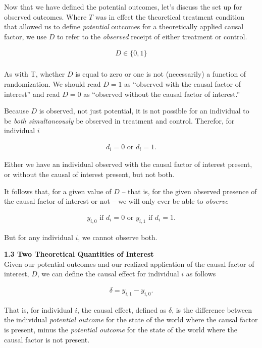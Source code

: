 \documentclass[11pt]{article}
\begin{document}
\normalsize
Now that we have defined the potential outcomes, let's discuss the set up for observed outcomes.  Where $T$ was in effect the theoretical treatment condition that allowed us to define \emph{potential} outcomes for a theoretically applied causal factor, we use $D$ to refer to the \emph{observed} receipt of either treatment or control.

\begin{align*}
  D \in \{0,1\}\\
\end{align*}

As with T, whether $D$ is equal to zero or one is not (necessarily) a function of randomization.  We should read $D=1$ as ``observed with the causal factor of interest'' and read $D=0$ as ``observed without the causal factor of interest.''

Because $D$ is observed, not just potential, it is not possible for an individual to be \emph{both simultaneously} be observed in treatment and control.  Therefor, for individual $i$

\begin{align*}
  d_{i} = 0 \text{ or } d_{i} = 1.
\end{align*}

Either we have an individual observed with the causal factor of interest present, or without the causal of interest present, but not both.

It follows that, for a given value of $D$ -- that is, for the given observed presence of the causal factor of interest or not -- we will only ever be able to \emph{observe}

\begin{align*}
  y_{i,0}  \text{ if } d_{i} = 0 \text{  or  } y_{i,1}  \text{ if } d_{i} = 1.
\end{align*}

But for any individual $i$, we cannot observe both.


\vspace{.2in}
\large{\textbf{1.3 Two Theoretical Quantities of Interest}} \\

\normalsize
Given our potential outcomes and our realized application of the causal factor of interest, $D$, we can define the causal effect for individual $i$ as follows

\begin{align*}
  \delta = y_{i,1} - y_{i,0}.
\end{align*}

That is, for individual $i$, the causal effect, defined as $\delta$, is the difference between the individual \emph{potential outcome} for the state of the world where the causal factor is present, minus the \emph{potential outcome} for the state of the world where the causal factor is not present.
\end{document}
